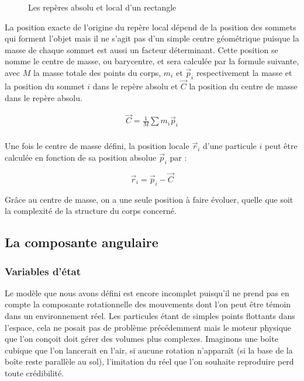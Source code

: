 \begin{figure}
  \centering
  
  \caption{Les repères absolu et local d'un rectangle}
  \label{reperelocal}
\end{figure}

La position exacte de l'origine du repère local dépend de la position
des sommets qui forment l'objet mais il ne s'agit pas d'un simple
centre géométrique puisque la masse de chaque sommet est aussi un
facteur déterminant. Cette position se nomme le centre de masse, ou
barycentre, et sera calculée par la formule suivante, avec $M$ la
masse totale des points du corps, $m_i$ et $\vec{p}_i$ respectivement
la masse et la position du sommet $i$ dans le repère absolu et
$\vec{C}$ la position du centre de masse dans le repère absolu.

\begin{align*}
  \vec{C} = \frac{1}{M} \sum m_i \vec{p}_i \\
\end{align*}

Une fois le centre de masse défini, la position locale
$\vec{r}_i$ d'une particule $i$ peut être calculée en fonction de sa
position absolue $\vec{p}_i$ par :

\[\vec{r}_i = \vec{p}_i - \vec{C}\]

Grâce au centre de masse, on a une seule position à faire évoluer,
quelle que soit la complexité de la structure du corps concerné.

\subsection{La composante angulaire}

\subsubsection{Variables d'état}

Le modèle que nous avons défini est encore incomplet puisqu'il ne
prend pas en compte la composante rotationnelle des mouvements dont
l'on peut être témoin dans un environnement réel. Les particules étant
de simples points flottants dans l'espace, cela ne posait pas de
problème précédemment mais le moteur physique que l'on conçoit doit
gérer des volumes plus complexes. Imaginons une boîte cubique que l'on
lancerait en l'air, si aucune rotation n'apparaît (si la base de la
boîte reste parallèle au sol), l'imitation du réel que l'on souhaite
reproduire perd toute crédibilité.

